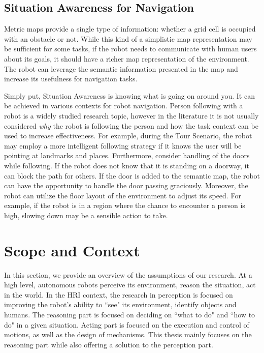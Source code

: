 \subsection{Situation Awareness for Navigation}

Metric maps provide a single type of information: whether a grid cell is occupied with an obstacle or not. While this kind of a simplistic map representation may be sufficient for some tasks, if the robot needs to communicate with human users about its goals, it should have a richer map representation of the environment. The robot can leverage the semantic information presented in the map and increase its usefulness for navigation tasks.


Simply put, Situation Awareness is knowing what is going on around you. It can be achieved in various contexts for robot navigation. Person following with a robot is a widely studied research topic, however in the literature it is not usually considered \textit{why} the robot is following the person and how the task context can be used to increase effectiveness. For example, during the Tour Scenario, the robot may employ a more intelligent following strategy if it knows the user will be pointing at landmarks and places. Furthermore, consider handling of the doors while following. If the robot does not know that it is standing on a doorway, it can block the path for others. If the door is added to the semantic map, the robot can have the opportunity to handle the door passing graciously. Moreover, the robot can utilize the floor layout of the environment to adjust its speed. For example, if the robot is in a region where the chance to encounter a person is high, slowing down may be a sensible action to take.






\section{Scope and Context}

In this section, we provide an overview of the assumptions of our research.  At a high level, autonomous robots perceive its environment, reason the situation, act in the world. In the HRI context, the research in perception is focused on improving the robot's ability to ``see" its environment, identify objects and humans. The reasoning part is focused on deciding on ``what to do" and ``how to do" in a given situation. Acting part is focused on the execution and control of motions, as well as the design of mechanisms. This thesis mainly focuses on the reasoning part while also offering a solution to the perception part.


